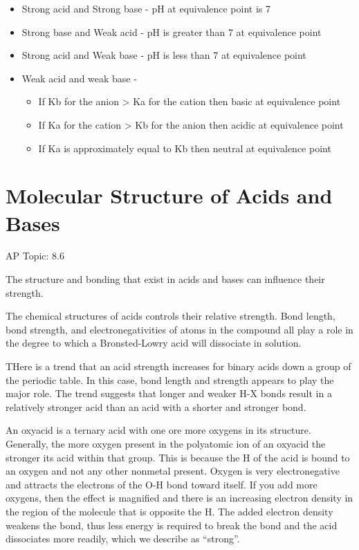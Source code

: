 \documentclass[../chem.tex]{subfiles}
\begin{document}
\begin{itemize}
    \item Strong acid and Strong base - pH at equivalence point is 7 
    \item Strong base and Weak acid - pH is greater than 7 at equivalence point 
    \item Strong acid and Weak base - pH is less than 7 at equivalence point 
    \item Weak acid and weak base - 
    \begin{itemize}
        \item If Kb for the anion > Ka for the cation then basic at equivalence point 
        \item If Ka for the cation > Kb for the anion then acidic at equivalence point 
        \item If Ka is approximately equal to Kb then neutral at equivalence point 
    \end{itemize}
\end{itemize}

\section{Molecular Structure of Acids and Bases}
AP Topic: 8.6

The structure and bonding that exist in acids and bases can influence their strength.

The chemical structures of acids controls their relative strength. Bond length, bond strength, and electronegativities of atoms in the compound all 
play a role in the degree to which a Bronsted-Lowry acid will dissociate in solution.

THere is a trend that an acid strength increases for binary acids down a group of the periodic table. In this case, bond length and strength appears to play the major role.
The trend suggests that longer and weaker H-X bonds result in a relatively stronger acid than an acid with a shorter and stronger bond.

An oxyacid is a ternary acid with one ore more oxygens in its structure. Generally, the more oxygen present in the polyatomic ion of an oxyacid 
the stronger its acid within that group. This is because the H of the acid is bound to an oxygen and not any other nonmetal present. Oxygen is very 
electronegative and attracts the electrons of the O-H bond toward itself. If you add more oxygens, then the effect is magnified and there is an increasing electron 
density in the region of the molecule that is opposite the H. The added electron density weakens the bond, thus less energy is required to break the bond and the acid dissociates more readily, which we describe as ``strong''.
\end{document}
